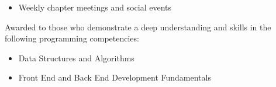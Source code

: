 \documentclass[10pt,a4paper,ragged2e,withhyper]{altacv}
\begin{document}
\begin{paracol}{2}
  \newline
\divider
{}
    
\begin{itemize}
\item Weekly chapter meetings and
social events
\end{itemize}
   
    \smallskip 
    
Awarded to those who demonstrate a deep understanding and skills in the following programming competencies: 
\begin{itemize}
\item Data Structures and Algorithms 
\item Front End and Back End Development Fundamentals
\end{itemize}





   
    \end{paracol}
    
 
    
    
    
\end{document}
